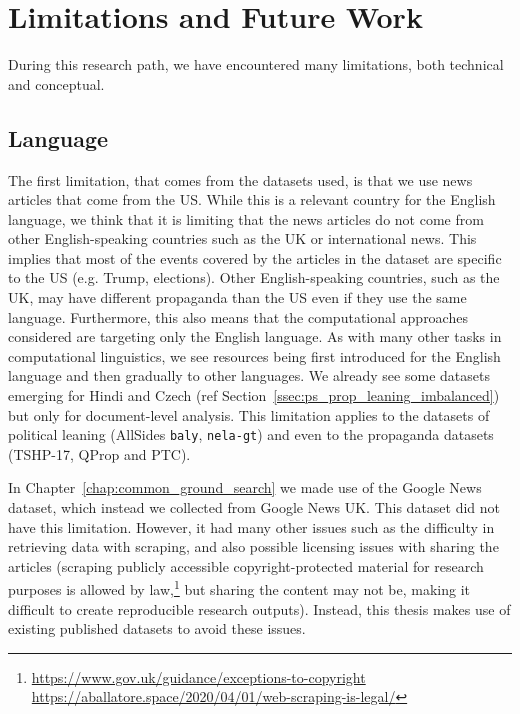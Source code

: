 \section{\statusgreen Limitations and Future Work}
\label{sec:discussion_limitations}

During this research path, we have encountered many limitations, both technical and conceptual.


\subsection{Language}
The first limitation, that comes from the datasets used, is that we use news articles that come from the US. While this is a relevant country for the English language, we think that it is limiting that the news articles do not come from other English-speaking countries %
such as the UK or international news.
This implies that most of the events covered by the articles in the dataset are specific to the US (e.g. Trump, elections).
Other English-speaking countries, such as the UK, may have different propaganda than the US even if they use the same language.
Furthermore, this also means that the computational approaches considered are targeting only the English language. %
As with many other tasks in computational linguistics, we see resources being first introduced for the English language and then gradually to other languages.
We already see some datasets emerging for Hindi and Czech (ref Section~\ref{ssec:ps_prop_leaning_imbalanced}) but only for document-level analysis.
This limitation applies to the datasets of political leaning (AllSides \texttt{baly}, \texttt{nela-gt}) and even to the propaganda datasets (TSHP-17, QProp and PTC).

In Chapter~\ref{chap:common_ground_search} we made use of the Google News dataset, which instead we collected from Google News UK. This dataset did not have this limitation.
However, it had many other issues such as the difficulty in retrieving data with scraping, and also possible licensing issues with sharing the articles (scraping publicly accessible copyright-protected material for research purposes is allowed by law,\footnote{\url{https://www.gov.uk/guidance/exceptions-to-copyright} \\ \url{https://aballatore.space/2020/04/01/web-scraping-is-legal/}} but sharing the content may not be, making it difficult to create reproducible research outputs).
Instead, this thesis makes use of existing published datasets to avoid these issues.

